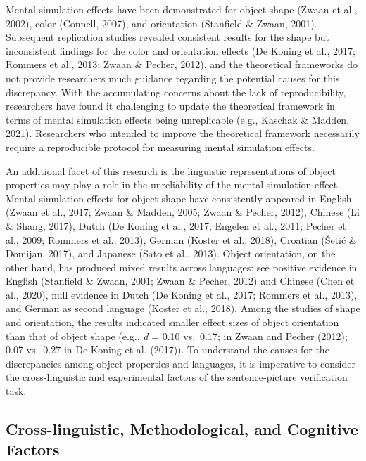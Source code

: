 \documentclass[
  man]{apa7}
\begin{document}
Mental simulation effects have been demonstrated for object shape (Zwaan et al., 2002), color (Connell, 2007), and orientation (Stanfield \& Zwaan, 2001). Subsequent replication studies revealed consistent results for the shape but inconsistent findings for the color and orientation effects (De Koning et al., 2017; Rommers et al., 2013; Zwaan \& Pecher, 2012), and the theoretical frameworks do not provide researchers much guidance regarding the potential causes for this discrepancy. With the accumulating concerns about the lack of reproducibility, researchers have found it challenging to update the theoretical framework in terms of mental simulation effects being unreplicable (e.g., Kaschak \& Madden, 2021). Researchers who intended to improve the theoretical framework necessarily require a reproducible protocol for measuring mental simulation effects.

An additional facet of this research is the linguistic representations of object properties may play a role in the unreliability of the mental simulation effect. Mental simulation effects for object shape have consistently appeared in English (Zwaan et al., 2017; Zwaan \& Madden, 2005; Zwaan \& Pecher, 2012), Chinese (Li \& Shang, 2017), Dutch (De Koning et al., 2017; Engelen et al., 2011; Pecher et al., 2009; Rommers et al., 2013), German (Koster et al., 2018), Croatian (Šetić \& Domijan, 2017), and Japanese (Sato et al., 2013). Object orientation, on the other hand, has produced mixed results across languages: see positive evidence in English (Stanfield \& Zwaan, 2001; Zwaan \& Pecher, 2012) and Chinese (Chen et al., 2020), null evidence in Dutch (De Koning et al., 2017; Rommers et al., 2013), and German as second language (Koster et al., 2018). Among the studies of shape and orientation, the results indicated smaller effect sizes of object orientation than that of object shape (e.g., \emph{d} = 0.10 vs.~0.17; in Zwaan and Pecher (2012); 0.07 vs.~0.27 in De Koning et al. (2017)). To understand the causes for the discrepancies among object properties and languages, it is imperative to consider the cross-linguistic and experimental factors of the sentence-picture verification task.

\hypertarget{cross-linguistic-methodological-and-cognitive-factors}{%
\subsection{Cross-linguistic, Methodological, and Cognitive Factors}\label{cross-linguistic-methodological-and-cognitive-factors}}
\end{document}
